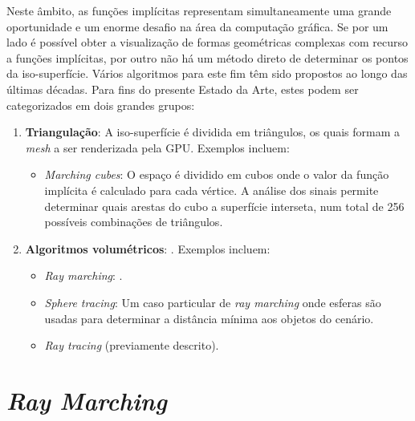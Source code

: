 Neste âmbito, as funções implícitas representam simultaneamente uma grande oportunidade e um enorme desafio na área da computação gráfica. Se por um lado é possível obter a visualização de formas geométricas complexas com recurso a funções implícitas, por outro não há um método direto de determinar os pontos da iso-superfície. Vários algoritmos para este fim têm sido propostos ao longo das últimas décadas. Para fins do presente Estado da Arte, estes podem ser categorizados em dois grandes grupos:

\begin{enumerate}
	\item \textbf{Triangulação}: A iso-superfície é dividida em triângulos, os quais formam a \textit{mesh} a ser renderizada pela \ac{GPU}. Exemplos incluem:
	\begin{itemize}[nosep]
		\item \textit{Marching cubes}\cite{Lorensen1987}: O espaço é dividido em cubos onde o valor da função implícita é calculado para cada vértice. A análise dos sinais permite determinar quais arestas do cubo a superfície interseta, num total de 256 possíveis combinações de triângulos.
	\end{itemize}
	
	\item \textbf{Algoritmos volumétricos}: . Exemplos incluem:
	\begin{itemize}
		\item \textit{Ray marching}: .
		\item \textit{Sphere tracing}\cite{Hart1996}: Um caso particular de \textit{ray marching} onde esferas são usadas para determinar a distância mínima aos objetos do cenário.
		\item \textit{Ray tracing} (previamente descrito).
	\end{itemize}
\end{enumerate}


\section{\emph{Ray Marching}}
\label{sec::arte:raymarch}

